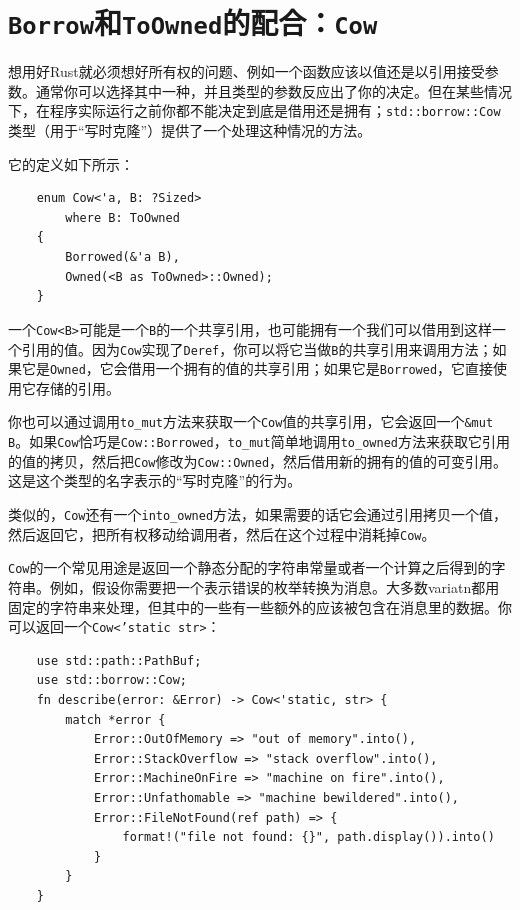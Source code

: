 \section{\texttt{Borrow}和\texttt{ToOwned}的配合：\texttt{Cow}}\label{Cow}

想用好Rust就必须想好所有权的问题、例如一个函数应该以值还是以引用接受参数。通常你可以选择其中一种，并且类型的参数反应出了你的决定。但在某些情况下，在程序实际运行之前你都不能决定到底是借用还是拥有；\texttt{std::borrow::Cow}类型（用于“写时克隆”）提供了一个处理这种情况的方法。

它的定义如下所示：
\begin{verbatim}
    enum Cow<'a, B: ?Sized>
        where B: ToOwned
    {
        Borrowed(&'a B),
        Owned(<B as ToOwned>::Owned);
    }
\end{verbatim}

一个\texttt{Cow<B>}可能是一个\texttt{B}的一个共享引用，也可能拥有一个我们可以借用到这样一个引用的值。因为\texttt{Cow}实现了\texttt{Deref}，你可以将它当做\texttt{B}的共享引用来调用方法；如果它是\texttt{Owned}，它会借用一个拥有的值的共享引用；如果它是\texttt{Borrowed}，它直接使用它存储的引用。

你也可以通过调用\texttt{to\_mut}方法来获取一个\texttt{Cow}值的共享引用，它会返回一个\texttt{\&mut B}。如果\texttt{Cow}恰巧是\texttt{Cow::Borrowed}，\texttt{to\_mut}简单地调用\texttt{to\_owned}方法来获取它引用的值的拷贝，然后把\texttt{Cow}修改为\texttt{Cow::Owned}，然后借用新的拥有的值的可变引用。这是这个类型的名字表示的“写时克隆”的行为。

类似的，\texttt{Cow}还有一个\texttt{into\_owned}方法，如果需要的话它会通过引用拷贝一个值，然后返回它，把所有权移动给调用者，然后在这个过程中消耗掉\texttt{Cow}。


\texttt{Cow}的一个常见用途是返回一个静态分配的字符串常量或者一个计算之后得到的字符串。例如，假设你需要把一个表示错误的枚举转换为消息。大多数variatn都用固定的字符串来处理，但其中的一些有一些额外的应该被包含在消息里的数据。你可以返回一个\texttt{Cow<'static str>}：
\begin{verbatim}
    use std::path::PathBuf;
    use std::borrow::Cow;
    fn describe(error: &Error) -> Cow<'static, str> {
        match *error {
            Error::OutOfMemory => "out of memory".into(),
            Error::StackOverflow => "stack overflow".into(),
            Error::MachineOnFire => "machine on fire".into(),
            Error::Unfathomable => "machine bewildered".into(),
            Error::FileNotFound(ref path) => {
                format!("file not found: {}", path.display()).into()
            }
        }
    }
\end{verbatim}

